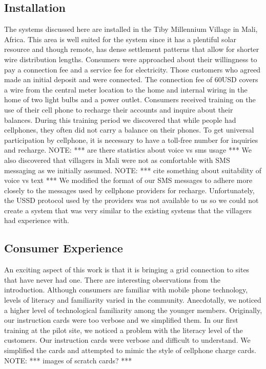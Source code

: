 \documentclass[conference]{IEEEtran}
\newcommand{\note}[1]{{\color{red} NOTE: *** #1 ***}}
\begin{document}
\subsection{Installation}
The systems discussed here are installed in the Tiby Millennium Village
in Mali, Africa.  This area is well suited for the system since it has
a plentiful solar resource and though remote, has dense settlement 
patterns that allow for shorter wire distribution lengths.  Consumers were 
approached about their willingness to pay a connection fee and a service
fee for electricity.  Those customers who agreed made an initial deposit 
and were connected.  
The connection fee of 60USD covers a wire from the central meter location
to the home and internal wiring in the home of two light bulbs and a 
power outlet.  Consumers received training on the use of their cell phone
to recharge their accounts and inquire about their balances.  
During this 
training period we discovered that while people had cellphones, they often
did not carry a balance on their phones.  To get universal participation
by cellphone, it is necessary to have a toll-free number for inquiries
and recharge.  
\note{are there statistics about voice vs sms usage}
We also discovered that villagers in Mali were not as comfortable 
with SMS messaging as we initially assumed.  \note{cite something about
suitability of voice vs text}  We modified the format of our
SMS messages to adhere more closely to the messages used by cellphone 
providers for recharge.  Unfortunately, the USSD protocol used by the
providers was not available to us so we could not create a system that was
very similar to the existing systems that the villagers had experience with.

\subsection{Consumer Experience}
An exciting aspect of this work is that it is bringing a grid connection
to sites that have never had one.  There are interesting observations from
the introduction.  Although consumers are familiar with mobile phone technology,
levels of literacy and familiarity varied in the community.  Anecdotally, we 
noticed a higher level of technological familiarity among the younger members.
Originally, our instruction cards were too verbose and we simplified them.
In our first training at the pilot site, we noticed a problem with the 
literacy level of the customers.  Our instruction cards were verbose and 
difficult to understand.  We simplified the cards and attempted to mimic 
the style of cellphone charge cards.
\note{images of scratch cards?}
\end{document}
